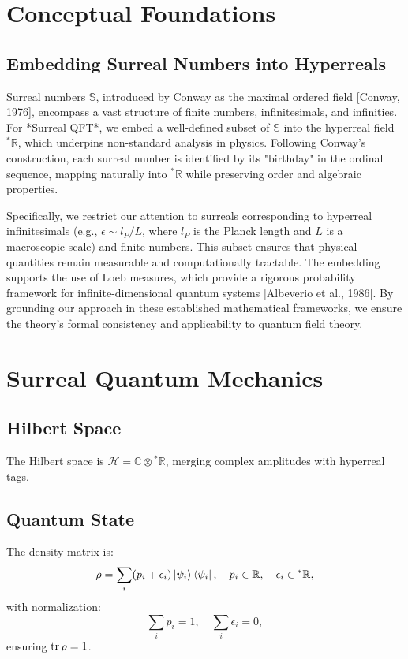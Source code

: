 \documentclass{article}
\begin{document}
\section{Conceptual Foundations}
\subsection{Embedding Surreal Numbers into Hyperreals}
Surreal numbers \(\mathbb{S}\), introduced by Conway as the maximal ordered field [Conway, 1976], encompass a vast structure of finite numbers, infinitesimals, and infinities. For *Surreal QFT*, we embed a well-defined subset of \(\mathbb{S}\) into the hyperreal field \({}^*\mathbb{R}\), which underpins non-standard analysis in physics. Following Conway’s construction, each surreal number is identified by its "birthday" in the ordinal sequence, mapping naturally into \({}^*\mathbb{R}\) while preserving order and algebraic properties.

Specifically, we restrict our attention to surreals corresponding to hyperreal infinitesimals (e.g., \(\epsilon \sim l_P / L\), where \(l_P\) is the Planck length and \(L\) is a macroscopic scale) and finite numbers. This subset ensures that physical quantities remain measurable and computationally tractable. The embedding supports the use of Loeb measures, which provide a rigorous probability framework for infinite-dimensional quantum systems [Albeverio et al., 1986]. By grounding our approach in these established mathematical frameworks, we ensure the theory’s formal consistency and applicability to quantum field theory.

\section{Surreal Quantum Mechanics}
\subsection{Hilbert Space}
The Hilbert space is \(\mathcal{H} = \mathbb{C} \otimes {}^*\mathbb{R}\), merging complex amplitudes with hyperreal tags.

\subsection{Quantum State}
The density matrix is:
\begin{equation}
\rho = \sum_i (p_i + \epsilon_i) \ket{\psi_i}\bra{\psi_i}, \quad p_i \in \mathbb{R}, \quad \epsilon_i \in {}^*\mathbb{R},
\end{equation}
with normalization:
\begin{equation}
\sum_i p_i = 1, \quad \sum_i \epsilon_i = 0,
\end{equation}
ensuring \(\tr \rho = 1\).
\end{document}
